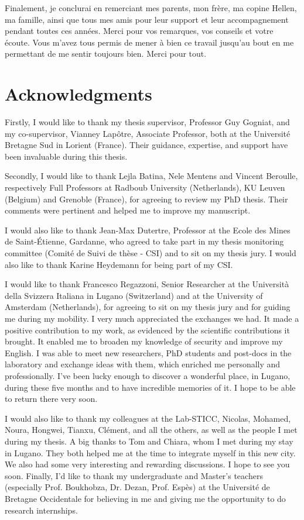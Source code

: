 Finalement, je conclurai en remerciant mes parents, mon frère, ma copine Hellen, ma famille, ainsi que tous mes amis pour leur support et leur accompagnement pendant toutes ces années. Merci pour vos remarques, vos conseils et votre écoute. Vous m'avez tous permis de mener à bien ce travail jusqu'au bout en me permettant de me sentir toujours bien.
Merci pour tout.

\chapter*{Acknowledgments}

Firstly, I would like to thank my thesis supervisor, Professor Guy Gogniat, and my co-supervisor, Vianney Lapôtre, Associate Professor, both at the Université Bretagne Sud in Lorient (France). Their guidance, expertise, and support have been invaluable during this thesis.

Secondly, I would like to thank Lejla Batina, Nele Mentens and Vincent Beroulle, respectively Full Professors at Radboub University (Netherlands), KU Leuven (Belgium) and Grenoble (France), for agreeing to review my PhD thesis. Their comments were pertinent and helped me to improve my manuscript.

I would also like to thank Jean-Max Dutertre, Professor at the Ecole des Mines de Saint-Étienne, Gardanne, who agreed to take part in my thesis monitoring committee (Comité de Suivi de thèse - CSI) and to sit on my thesis jury. I would also like to thank Karine Heydemann for being part of my CSI.

I would like to thank Francesco Regazzoni, Senior Researcher at the Università della Svizzera Italiana in Lugano (Switzerland) and at the University of Amsterdam (Netherlands), for agreeing to sit on my thesis jury and for guiding me during my mobility. I very much appreciated the exchanges we had. It made a positive contribution to my work, as evidenced by the scientific contributions it brought. It enabled me to broaden my knowledge of security and improve my English. I was able to meet new researchers, PhD students and post-docs in the laboratory and exchange ideas with them, which enriched me personally and professionally. I've been lucky enough to discover a wonderful place, in Lugano, during these five months and to have incredible memories of it. I hope to be able to return there very soon.

I would also like to thank my colleagues at the Lab-STICC, Nicolas, Mohamed, Noura, Hongwei, Tianxu, Clément, and all the others, as well as the people I met during my thesis. A big thanks to Tom and Chiara, whom I met during my stay in Lugano. They both helped me at the time to integrate myself in this new city. We also had some very interesting and rewarding discussions. I hope to see you soon. Finally, I'd like to thank my undergraduate and Master's teachers (especially Prof. Boukhobza, Dr. Dezan, Prof. Espès) at the Université de Bretagne Occidentale for believing in me and giving me the opportunity to do research internships.

